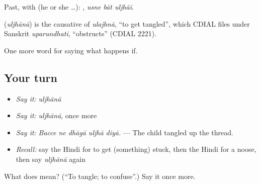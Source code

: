 Past, with  (he or she …):   , \emph{usne bāt uljhāī}.

\begin{cousinweb}
\textbf{} (\emph{uljhānā}) is the causative of \emph{ulajhnā}, \textquotedblleft{}to get tangled\textquotedblright{}, which CDIAL files under Sanskrit \emph{uparundhati}, \textquotedblleft{}obstructs\textquotedblright{} (CDIAL 2221).
\end{cousinweb}

\begin{grammarlens}[title={What you've built}]
One more word for saying what happens if.
\end{grammarlens}

\subsection*{Your turn}
\begin{itemize}
\raggedright
  \item \emph{Say it:} \emph{uljhānā}
  \item \emph{Say it:} \emph{uljhānā}, once more
  \item \emph{Say it:} \emph{Bacce ne dhāgā uljhā diyā.} — The child tangled up the thread.
  \item \emph{Recall:} say the Hindi for to get (something) stuck, then the Hindi for a noose, then say \emph{uljhānā} again
\end{itemize}

\begin{tcolorbox}[breakable,colback=teal!4,colframe=teal!35!black,title={Before you move on}]
What does  mean? (\textquotedblleft{}To tangle; to confuse\textquotedblright{}.) Say it once more.
\end{tcolorbox}
